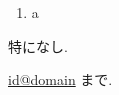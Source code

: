 \documentclass[a4paper,12pt,dvipdfmx]{amsart}
\begin{document}
\begin{sugakuKodoku2}



  \begin{textbooks}
    \begin{enumerate}
      \item a
    \end{enumerate}
  \end{textbooks}
  
  \begin{comments}
    特になし.
  \end{comments}


  \begin{misc}
    \url{id@domain} まで.
  \end{misc}
  
\end{sugakuKodoku2}
\end{document}
